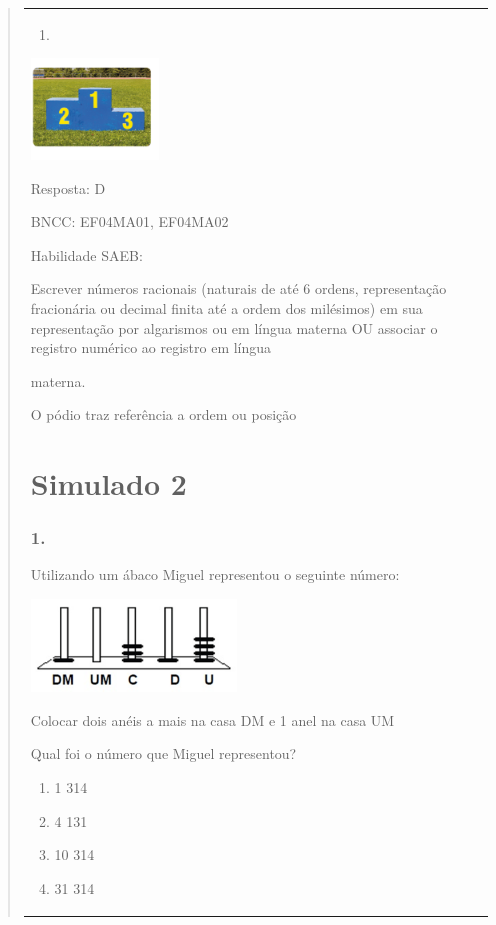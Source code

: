 \begin{enumerate}
\begin{escolha}
\begin{enumerate}
\begin{itemize}
\begin{itemize}
\begin{escolha}
\begin{quote}
\begin{escolha}
{\begin{longtable}[]{@{}l@{}}
\begin{itemize}
\begin{enumerate}
\def\labelenumi{\alph{enumi})}
\item
\end{enumerate}

\includegraphics[width=1.33345in,height=1.05843in]{media/image151.png}

Resposta: D

BNCC: EF04MA01, EF04MA02

Habilidade SAEB:

Escrever números racionais (naturais de até 6 ordens, representação
fracionária ou decimal finita até a ordem dos milésimos) em sua
representação por algarismos ou em língua materna OU associar o registro
numérico ao registro em língua

materna.

O pódio traz referência a ordem ou posição

\section{Simulado 2}\label{simulado-2}

\subsubsection{1.}\label{section-157}

Utilizando um ábaco Miguel representou o seguinte número:

\includegraphics[width=2.14744in,height=0.97003in]{media/image152.png}

Colocar dois anéis a mais na casa DM e 1 anel na casa UM

Qual foi o número que Miguel representou?

\begin{enumerate}
\def\labelenumi{\alph{enumi})}
\item
  1 314
\item
  4 131
\item
  10 314
\item
  31 314
\end{enumerate}


\end{itemize}
\end{longtable}}
\end{escolha}
\end{quote}
\end{escolha}
\end{itemize}
\end{itemize}
\end{enumerate}
\end{escolha}
\end{enumerate}
